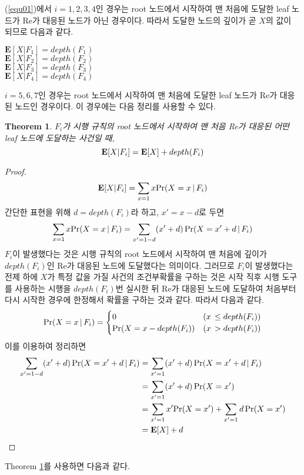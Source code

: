 \documentclass[11pt]{article}
\newtheorem{theorem}{Theorem}
\begin{document}
(\ref{equ01})에서 $i = 1,2,3,4$인 경우는 root 노드에서 시작하여 맨 처음에 도달한 leaf 노드가 Re가 대응된 노드가 아닌 경우이다. 따라서 도달한 노드의 깊이가 곧 $X$의 값이 되므로 다음과 같다.

\singlespacing
\begin{center}
$\textbf{E}[X|F_{1}]=depth(F_{1})$\\
$\textbf{E}[X|F_{2}]=depth(F_{2})$\\
$\textbf{E}[X|F_{3}]=depth(F_{3})$\\
$\textbf{E}[X|F_{4}]=depth(F_{4})$\\
\end{center}
\doublespacing

$i = 5,6,7$인 경우는 root 노드에서 시작하여 맨 처음에 도달한 leaf 노드가 Re가 대응된 노드인 경우이다. 이 경우에는 다음 정리를 사용할 수 있다.

\singlespacing
\begin{theorem}
$F_{i}$가 시행 규칙의 root 노드에서 시작하여 맨 처음 Re가 대응된 어떤 leaf 노드에 도달하는 사건일 때,\\
\[\textnormal{\textbf{E}}[X|F_{i}]=\textnormal{\textbf{E}}[X]+depth(F_{i})\]
\label{thm03}
\end{theorem}
\doublespacing

\begin{proof}
\[\textnormal{\textbf{E}}[X|F_{i}] = \sum_{x=1} x \textnormal{Pr}(X = x\,|\,F_{i})\]
간단한 표현을 위해 $d = depth(F_{i})$라 하고, $x'=x-d$로 두면
\[\sum_{x=1} x \textnormal{Pr}(X = x\,|\,F_{i}) = \sum_{x'=1-d} (x'+d)\,\textnormal{Pr}(X = x'+d\,|\,F_{i})\]
$F_{i}$이 발생했다는 것은 시행 규칙의 root 노드에서 시작하여 맨 처음에 깊이가 $depth(F_{i})$인 Re가 대응된 노드에 도달했다는 의미이다. 그러므로 $F_{i}$이 발생했다는 전제 하에 $X$가 특정 값을 가질 사건의 조건부확률을 구하는 것은 시작 직후 시행 도구를 사용하는 시행을 $depth(F_{i})$번 실시한 뒤 Re가 대응된 노드에 도달하여 처음부터 다시 시작한 경우에 한정해서 확률을 구하는 것과 같다. 따라서 다음과 같다.
\[
\textnormal{Pr}(X = x\,|\,F_{i}) =
\begin{cases}
0 & (x\,\le depth(F_{i}))\\
\textnormal{Pr}(X = x-depth(F_{i})) & (x\,> depth(F_{i}))
\end{cases}
\]
이를 이용하여 정리하면
\[
\begin{split}
\sum_{x'=1-d} (x'+d)\,\textnormal{Pr}(X = x'+d\,|\,F_{i}) & = \sum_{x'=1} (x'+d)\,\textnormal{Pr}(X = x'+d\,|\,F_{i})\\
& = \sum_{x'=1} (x'+d)\,\textnormal{Pr}(X = x')\\
& = \sum_{x'=1} x'\textnormal{Pr}(X = x') + \sum_{x'=1} d\,\textnormal{Pr}(X = x')\\
& = \textnormal{\textbf{E}}[X]+d
\end{split}
\]
\end{proof}
\noindent Theorem \ref{thm03}를 사용하면 다음과 같다.
\end{document}
